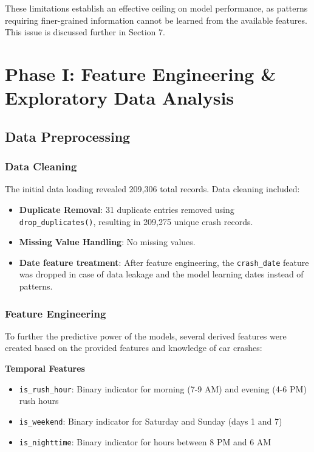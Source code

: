 \documentclass[stu,12pt,floatsintext]{apa7}
\begin{document}
These limitations establish an effective ceiling on model performance, as patterns requiring finer-grained information cannot be learned from the available features. This issue is
discussed further in Section 7.

\section{Phase I: Feature Engineering \& Exploratory Data Analysis}

\subsection{Data Preprocessing}

\subsubsection{Data Cleaning}

The initial data loading revealed 209,306 total records. Data cleaning included:

\begin{itemize}
    \item \textbf{Duplicate Removal}: 31 duplicate entries removed using \texttt{drop\_duplicates()}, resulting in 209,275 unique crash records.
    \item \textbf{Missing Value Handling}: No missing values.
    \item \textbf{Date feature treatment}: After feature engineering, the \texttt{crash\_date} feature was dropped in case of data leakage and the model learning 
    dates instead of patterns.
\end{itemize}

\subsubsection{Feature Engineering}

To further the predictive power of the models, several derived features were created based on the provided features and knowledge of car crashes:

\textbf{Temporal Features}
\begin{itemize}
    \item \texttt{is\_rush\_hour}: Binary indicator for morning (7-9 AM) and evening (4-6 PM) rush hours
    \item \texttt{is\_weekend}: Binary indicator for Saturday and Sunday (days 1 and 7)
    \item \texttt{is\_nighttime}: Binary indicator for hours between 8 PM and 6 AM
\end{itemize}
\end{document}
